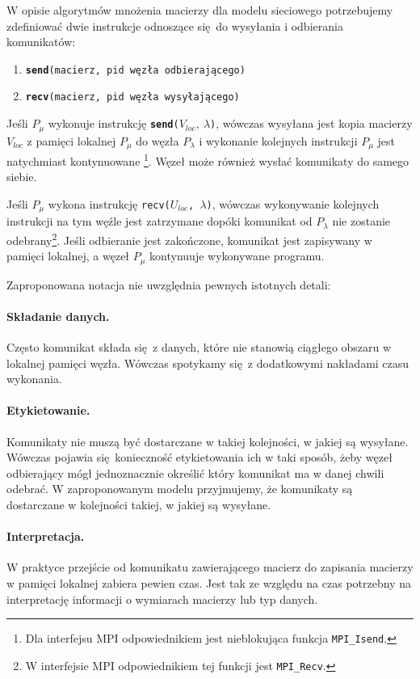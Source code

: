 W opisie algorytmów mnożenia macierzy dla modelu sieciowego potrzebujemy zdefiniować dwie instrukcje odnoszące się do wysyłania i odbierania komunikatów:
\begin{enumerate}
 \item \texttt{\textbf{send}({macierz}, {pid węzła odbierającego})}
 \item \texttt{\textbf{recv}({macierz}, {pid węzła wysyłającego})}
\end{enumerate}

Jeśli \(P_\mu\) wykonuje instrukcję \texttt{\textbf{send}(}\(V_{loc},\:\lambda\)\texttt{)}, wówczas wysyłana jest kopia macierzy \(V_{loc}\) z pamięci lokalnej \(P_\mu\) do węzła \(P_\lambda\) i wykonanie kolejnych instrukcji \(P_\mu\) jest natychmiast kontynuowane \footnote{Dla interfejsu MPI odpowiednikiem jest nieblokująca funkcja \texttt{MPI\_Isend}.}. Węzeł może również wysłać komunikaty do samego siebie.


Jeśli \(P_\mu\) wykona instrukcję \texttt{recv(\(U_{loc}\), \(\lambda\))}, wówczas wykonywanie kolejnych instrukcji na tym węźle jest zatrzymane dopóki komunikat od \(P_\lambda\) nie zostanie odebrany\footnote{W interfejsie MPI odpowiednikiem tej funkcji jest \texttt{MPI\_Recv}.}. Jeśli odbieranie jest zakończone, komunikat jest zapisywany w pamięci lokalnej, a węzeł \(P_\mu\) kontynuuje wykonywane programu.

\begin{uwaga}
Zaproponowana notacja nie uwzględnia pewnych istotnych detali:

\paragraph{Składanie danych.} Często komunikat składa się z danych, które nie stanowią ciągłego obszaru w lokalnej pamięci węzła. Wówczas spotykamy się z dodatkowymi nakładami czasu wykonania.
\paragraph{Etykietowanie.} Komunikaty nie muszą być dostarczane w takiej kolejności, w jakiej są wysyłane. Wówczas pojawia się konieczność etykietowania ich w taki sposób, żeby węzeł odbierający mógł jednoznacznie określić który komunikat ma w danej chwili odebrać. W zaproponowanym modelu przyjmujemy, że komunikaty są dostarczane w kolejności takiej, w jakiej są wysyłane.
\paragraph{Interpretacja.} W praktyce przejście od komunikatu zawierającego macierz do zapisania macierzy w pamięci lokalnej zabiera pewien czas. Jest tak ze względu na czas potrzebny na interpretację informacji o wymiarach macierzy lub typ danych.
\end{uwaga}

